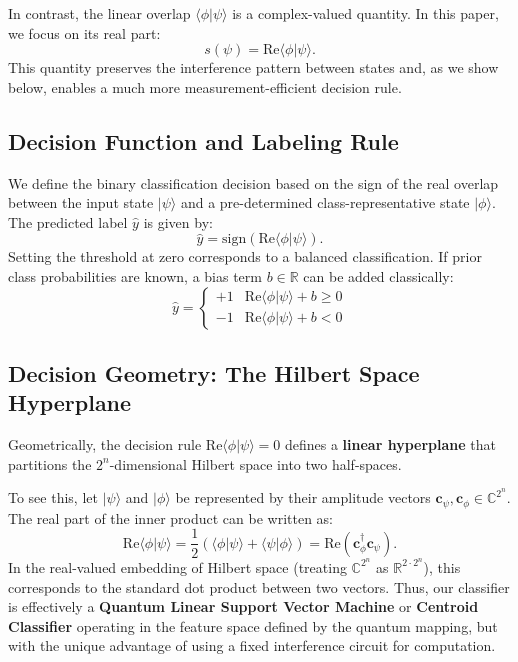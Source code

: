 \documentclass[conference]{IEEEtran}
\begin{document}
In contrast, the linear overlap $\langle \phi | \psi \rangle$ is a complex-valued quantity. In this paper, we focus on its real part:
\begin{equation}
s(\psi) = \mathrm{Re}\langle \phi | \psi \rangle.
\end{equation}
This quantity preserves the interference pattern between states and, as we show below, enables a much more measurement-efficient decision rule.

\subsection{Decision Function and Labeling Rule}

We define the binary classification decision based on the sign of the real overlap between the input state $|\psi\rangle$ and a pre-determined class-representative state $|\phi\rangle$. The predicted label $\hat{y}$ is given by:
\begin{equation}
\hat{y} = \text{sign}\left( \mathrm{Re}\langle \phi | \psi \rangle \right).
\end{equation}
Setting the threshold at zero corresponds to a balanced classification. If prior class probabilities are known, a bias term $b \in \mathbb{R}$ can be added classically:
\begin{equation}
\hat{y} = \begin{cases} +1 & \mathrm{Re}\langle \phi | \psi \rangle + b \geq 0 \\ -1 & \mathrm{Re}\langle \phi | \psi \rangle + b < 0 \end{cases}
\end{equation}

\subsection{Decision Geometry: The Hilbert Space Hyperplane}

Geometrically, the decision rule $\mathrm{Re}\langle \phi | \psi \rangle = 0$ defines a \textbf{linear hyperplane} that partitions the $2^n$-dimensional Hilbert space into two half-spaces. 

To see this, let $|\psi\rangle$ and $|\phi\rangle$ be represented by their amplitude vectors $\mathbf{c}_\psi, \mathbf{c}_\phi \in \mathbb{C}^{2^n}$. The real part of the inner product can be written as:
\begin{equation}
\mathrm{Re}\langle \phi | \psi \rangle = \frac{1}{2}\left( \langle \phi | \psi \rangle + \langle \psi | \phi \rangle \right) = \text{Re}(\mathbf{c}_\phi^\dagger \mathbf{c}_\psi).
\end{equation}
In the real-valued embedding of Hilbert space (treating $\mathbb{C}^{2^n}$ as $\mathbb{R}^{2 \cdot 2^n}$), this corresponds to the standard dot product between two vectors. Thus, our classifier is effectively a \textbf{Quantum Linear Support Vector Machine} or \textbf{Centroid Classifier} operating in the feature space defined by the quantum mapping, but with the unique advantage of using a fixed interference circuit for computation.
\end{document}
